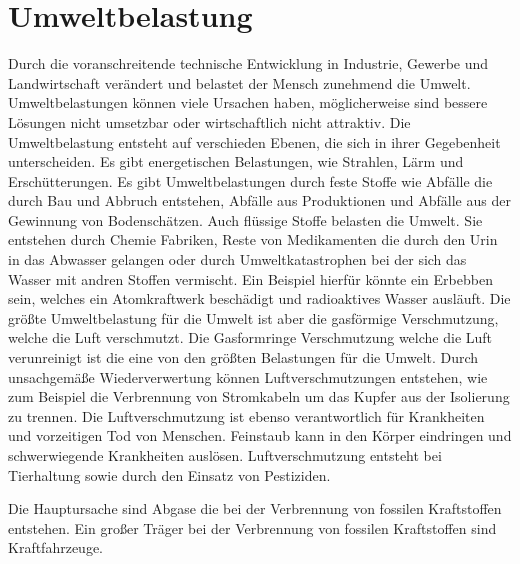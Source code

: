 \chapter{Umweltbelastung}
Durch die voranschreitende technische Entwicklung in Industrie, Gewerbe und Landwirtschaft verändert und belastet der Mensch zunehmend die Umwelt.
Umweltbelastungen können viele Ursachen haben, möglicherweise sind bessere Lösungen nicht umsetzbar oder wirtschaftlich nicht attraktiv.
Die Umweltbelastung entsteht auf verschieden Ebenen, die sich in ihrer Gegebenheit unterscheiden.
Es gibt energetischen Belastungen, wie Strahlen, Lärm und Erschütterungen.
Es gibt Umweltbelastungen durch feste Stoffe wie Abfälle die durch Bau und Abbruch entstehen, Abfälle aus Produktionen und Abfälle aus der Gewinnung von Bodenschätzen.
Auch flüssige Stoffe belasten die Umwelt. Sie entstehen durch Chemie Fabriken, Reste von Medikamenten die durch den Urin in das Abwasser gelangen oder durch Umweltkatastrophen bei der sich das Wasser mit andren Stoffen vermischt.
Ein Beispiel hierfür könnte ein Erbebben sein, welches ein Atomkraftwerk beschädigt und radioaktives Wasser ausläuft.
Die größte Umweltbelastung für die Umwelt ist aber die gasförmige Verschmutzung, welche die Luft verschmutzt.
Die Gasformringe Verschmutzung welche die Luft verunreinigt ist die eine von den größten Belastungen für die Umwelt.
Durch unsachgemäße Wiederverwertung können Luftverschmutzungen entstehen, wie zum Beispiel die Verbrennung von
Stromkabeln um das Kupfer aus der Isolierung zu trennen.
Die Luftverschmutzung ist ebenso verantwortlich für Krankheiten und vorzeitigen Tod von Menschen.
Feinstaub kann in den Körper eindringen und schwerwiegende Krankheiten auslösen.
Luftverschmutzung entsteht bei Tierhaltung sowie durch den Einsatz von Pestiziden.

Die Hauptursache sind Abgase die bei der Verbrennung von fossilen Kraftstoffen entstehen.
Ein großer Träger bei der Verbrennung von fossilen Kraftstoffen sind Kraftfahrzeuge.
